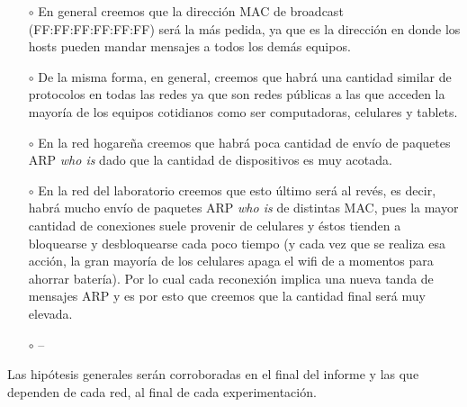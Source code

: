\begin{itemize}
\item[$\circ$]En general creemos que la direcci\'on MAC de broadcast (FF:FF:FF:FF:FF:FF) ser\'a la m\'as pedida, ya que es la direcci\'on en donde los hosts pueden mandar mensajes a todos los dem\'as equipos. %
\item[$\circ$]De la misma forma, en general, creemos que habr\'a una cantidad similar de protocolos en todas las redes ya que son redes p\'ublicas a las que acceden la mayor\'ia de los equipos cotidianos como ser computadoras, celulares y tablets.
\item[$\circ$]En la red hogare\~na creemos que habr\'a poca cantidad de env\'io de paquetes ARP \textit{who is} dado que la cantidad de dispositivos es muy acotada.
\item[$\circ$]En la red del laboratorio creemos que esto \'ultimo ser\'a al rev\'es, es decir, habr\'a mucho env\'io de paquetes ARP \textit{who is} de distintas MAC, pues la mayor cantidad de conexiones suele provenir de celulares y \'estos tienden a bloquearse y desbloquearse cada poco tiempo (y cada vez que se realiza esa acci\'on, la gran mayor\'ia de los celulares apaga el wifi de a momentos para ahorrar bater\'ia). Por lo cual cada reconexi\'on implica una nueva tanda de mensajes ARP y es por esto que creemos que la cantidad final ser\'a muy elevada.
\item[$\circ$] --
\end{itemize}

Las hip\'otesis generales ser\'an corroboradas en el final del informe y las que dependen de cada red, al final de cada experimentaci\'on.

